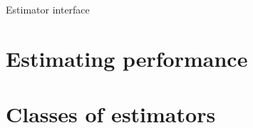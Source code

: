 \begin{remark}{Estimator interface}
\todo{}
\end{remark}






\section{Estimating performance}


\section{Classes of estimators}
